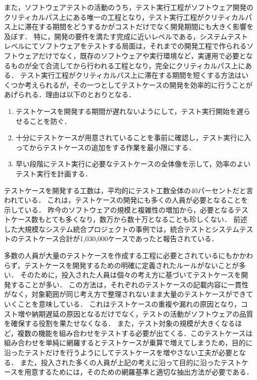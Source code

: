 また，ソフトウェアテストの活動のうち，テスト実行工程がソフトウェア開発のクリティカルパス上にある唯一の工程となり，テスト実行工程がクリティカルパス上に滞在する期間をどうするかがコストだけでなく開発期間にも大きく影響を及ぼす．
特に，開発の要件を満たす完成に近いレベルである，システムテストレベルにてソフトウェアをテストする局面は，それまでの開発工程で作られるソフトウェアだけでなく，既存のソフトウェアや実行環境など，実運用で必要となるものが全て合流してから行われる工程となり，完全にクリティカルパス上にある．
テスト実行工程がクリティカルパス上に滞在する期間を短くする方法はいくつか考えられるが，その一つとしてテストケースの開発を効率的に行うことがあげられる．理由は以下のとおりとなる．
\begin{enumerate}
\item テストケースを開発する期間が遅れないようにして，テスト実行開始を遅らせることを防ぐ．
\item 十分にテストケースが用意されていることを事前に確認し，テスト実行に入ってからテストケースの追加をする作業を最小限にする．
\item 早い段階にテスト実行に必要なテストケースの全体像を示して，効率のよいテスト実行を計画する．
\end{enumerate}
テストケースを開発する工数は，平均的にテスト工数全体の40パーセントだと言われている\cite{van2013tpi}．
これは，テストケースの開発にも多くの人員が必要となることを示している．
昨今のソフトウェアの規模と複雑性の増加から，必要となるテストケース数もとても多くなり，数万から数十万となることも珍しくない．
前述した大規模なシステム統合プロジェクトの事例では，統合テストとシステムテストのテストケース合計が1,030,000ケースであったと報告されている．

多数の人員が大量のテストケースを作成する工程に必要とされているにもかかわらず，テストケースを開発するための明確に定義されたルールがないことが多い．
そのために，投入された人員は個々の考え方に基づいてテストケースを開発することが多い．
この方法は，それぞれのテストケースの記載内容に一貫性がなく，対象範囲が同じ考え方で整理されないまま大量のテストケースができていくことを意味している．
これはテストケースの重複や漏れの原因となり，コスト増や納期遅延の原因となるだけでなく，テストの活動がソフトウェアの品質を確保する役割を果たせなくなる．
また，テスト対象の規模が大きくなるほど，複数の機能を組み合わせをテストする必要が出てくる．このテストケースは組み合わせを単純に網羅するとテストケースが乗算で増えてしまうため，目的に沿ったテストだけを行うようにしてテストケースを増やさない工夫が必要となる．
また，投入された多くの人員が上記の考えに沿って目的に沿ったテストケースを用意するためには，そのための網羅基準と適切な抽出方法が必要である．

